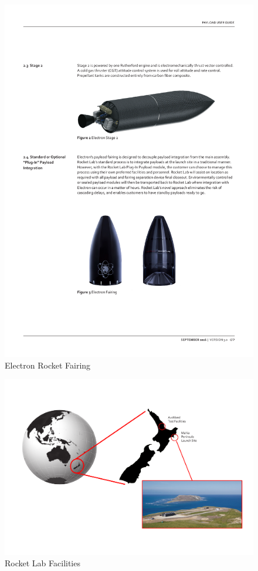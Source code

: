 \begin{figure}[H]
\centering 
\includegraphics[scale=0.7]{./sections/Constellation_Deployment/S2-Launcher/Images_S2/Picture_3_S2.pdf} 
\caption{Electron Rocket Fairing}
\end{figure}

\begin{figure}[H]
\includegraphics[scale=0.5]{./sections/Constellation_Deployment/S2-Launcher/Images_S2/Picture_4_S2.pdf} 
\caption{Rocket Lab Facilities}
\label{facilities}
\end{figure}